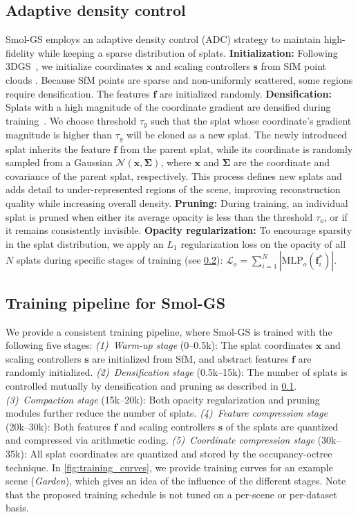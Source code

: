 \documentclass{article}
\def\vf{{\bm{f}}}
\def\vs{{\bm{s}}}
\def\vx{{\bm{x}}}
\newcommand{\ours}{Smol-GS\xspace}
\newcommand{\MLP}{\mathrm{MLP}}
\begin{document}
\subsection{Adaptive density control}
\label{sec:adc}
\ours employs an adaptive density control (ADC) strategy to maintain high-fidelity while keeping a sparse distribution of splats.
%
\textbf{Initialization:}
Following 3DGS~\cite{kerbl20233dgs}, we initialize coordinates $\vx$ and scaling controllers $\vs$ from SfM point clouds \cite{schonberger2016sfm}. Because SfM points are sparse and non-uniformly scattered, some regions require densification. The features $\vf$ are initialized randomly.
%
\textbf{Densification:} 
Splats with a high magnitude of the coordinate gradient are densified during training~\cite{lu2024scaffoldgs}. We choose threshold $\tau_g$ such that the splat whose coordinate's gradient magnitude is higher than $\tau_{g}$ will be cloned as a new splat. The newly introduced splat inherits the feature $\vf$ from the parent splat, while its coordinate is randomly sampled from a Gaussian $\mathcal{N}(\vx, \bm{\Sigma})$, where $\vx$ and $\bm{\Sigma}$ are the coordinate and covariance of the parent splat, respectively. This process defines new splats and adds detail to under-represented regions of the scene, improving reconstruction quality while increasing overall density.
%
\textbf{Pruning:} 
During training, an individual splat is pruned when either its average opacity is less than the threshold $\tau_{o}$, or if it remains consistently invisible. %
%
\textbf{Opacity regularization:} 
To encourage sparsity in the splat distribution, we apply an $L_1$ regularization loss on the opacity of all $N$ splats during specific stages of training (see \cref{sec:training_stages}): 
%
  $\mathcal{L}_{o} = \sum_{i=1}^{N} |\MLP_o(\vf_i^*)|.$
%


\subsection{Training pipeline for \ours}
\label{sec:training_stages}
%
%
We provide a consistent training pipeline, where \ours is trained with the following five stages: 
{\em (1)}~{\em Warm-up stage} (0--0.5k): The splat coordinates $\vx$ and scaling controllers $\vs$ are initialized from SfM, and abstract features $\vf$ are randomly initialized. 
{\em (2)}~{\em Densification stage} (0.5k--15k): The number of splats is controlled mutually by densification and pruning as described in \cref{sec:adc}. 
{\em (3)}~{\em Compaction stage} (15k--20k): Both opacity regularization and pruning modules further reduce the number of splats. 
{\em (4)}~{\em Feature compression stage} (20k--30k): Both features $\vf$ and scaling controllers $\vs$ of the splats are quantized and compressed via arithmetic coding. 
{\em (5)}~{\em Coordinate compression stage} (30k--35k): All splat coordinates are quantized and stored by the occupancy-octree technique. 
In \cref{fig:training_curves}, we provide training curves for an example scene ({\it Garden}), which gives an idea of the influence of the different stages. Note that the proposed training schedule is not tuned on a per-scene or per-dataset basis.
\end{document}
